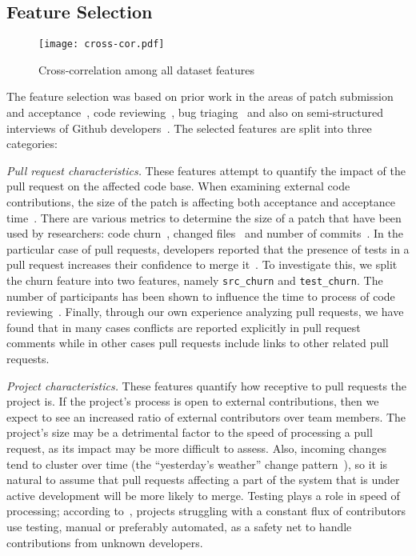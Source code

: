 \documentclass{sig-alternate}
\begin{document}
\subsection{Feature Selection} 

\begin{figure}
  \begin{center}
    \texttt{[image: cross-cor.pdf]}
  \end{center}
  \caption{Cross-correlation among all dataset features}
  \label{fig:wordcloud}
\end{figure}


The feature selection was based on prior work in the areas of patch submission
and acceptance~\cite{Nagap05,Bird07a,Weiss08,Baysa12}, code
reviewing~\cite{Rigby13}, bug triaging~\cite{Anvik06, Giger10} and also on
semi-structured interviews of Github developers~\cite{Dabbi12, Pham13, McDon13}.
The selected features are split into three categories:

  \emph{Pull request characteristics.} These features attempt to quantify the
  impact of the pull request on the affected code base. When examining external
  code contributions, the size of the patch is affecting both acceptance and
  acceptance time~\cite{Weiss08}. There are various metrics to determine the
  size of a patch that have been used by researchers: code churn~\cite{Nagap05,
  Ratzi07}, changed files~\cite{Nagap05} and number of commits~\cite{Fluri07}.
  In the particular case of pull requests, developers reported that the presence
  of tests in a pull request increases their confidence to merge
  it~\cite{Pham13}. To investigate this, we split the churn feature into two
  features, namely \texttt{src\_churn} and \texttt{test\_churn}. The
  number of participants has been shown to influence the time to process of code
  reviewing~\cite{Rigby13}. Finally, through our own experience analyzing pull
  requests, we have found that in many cases conflicts are reported explicitly
  in pull request comments while in other cases pull requests include links to
  other related pull requests.

  \emph{Project characteristics.} These features quantify how receptive to pull
  requests the project is. If the project's process is open to external
  contributions, then we expect to see an increased ratio of external
  contributors over team members. The project's size may be a detrimental factor
  to the speed of processing a pull request, as its impact may be more difficult
  to assess. Also, incoming changes tend to cluster over time (the ``yesterday's
  weather'' change pattern~\cite{Girba04}), so it is natural to assume that pull
  requests affecting a part of the system that is under active development will
  be more likely to merge. Testing plays a role in speed of processing;
  according to~\cite{Pham13}, projects struggling with a constant flux of
  contributors use testing, manual or preferably automated, as a safety net to
  handle contributions from unknown developers.
\end{document}
